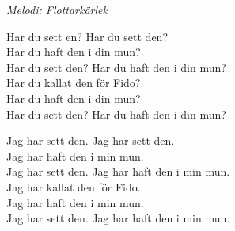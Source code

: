 {\footnotesize\textit{Melodi: Flottarkärlek}}\par
\vspace{10pt}
Har du sett en? Har du sett den?\\
Har du haft den i din mun?\\
Har du sett den? Har du haft den i din mun?\\
Har du kallat den för Fido?\\
Har du haft den i din mun?\\
Har du sett den? Har du haft den i din mun?\par
\vspace{10pt}
Jag har sett den. Jag har sett den.\\
Jag har haft den i min mun.\\
Jag har sett den. Jag har haft den i min mun.\\
Jag har kallat den för Fido.\\
Jag har haft den i min mun.\\
Jag har sett den. Jag har haft den i min mun.

